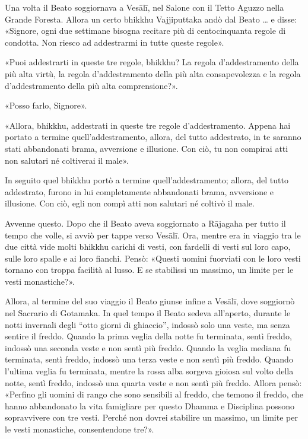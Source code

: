 
Una volta il Beato soggiornava a Vesālī, nel Salone con il Tetto Aguzzo nella
Grande Foresta. Allora un certo bhikkhu Vajjiputtaka andò dal Beato … e disse:
«Signore, ogni due settimane bisogna recitare più di centocinquanta regole di
condotta. Non riesco ad addestrarmi in tutte queste regole».

«Puoi addestrarti in queste tre regole, bhikkhu? La regola d’addestramento della
più alta virtù, la regola d’addestramento della più alta consapevolezza e la
regola d’addestramento della più alta comprensione?».

«Posso farlo, Signore».

«Allora, bhikkhu, addestrati in queste tre regole d’addestramento. Appena hai
portato a termine quell’addestramento, allora, del tutto addestrato, in te
saranno stati abbandonati brama, avversione e illusione. Con ciò, tu non
compirai atti non salutari né coltiverai il male».

In seguito quel bhikkhu portò a termine quell’addestramento; allora, del tutto
addestrato, furono in lui completamente abbandonati brama, avversione e
illusione. Con ciò, egli non compì atti non salutari né coltivò il male.


 Avvenne questo. Dopo che il Beato aveva soggiornato a
Rājagaha per tutto il tempo che volle, si avviò per tappe verso Vesālī. Ora,
mentre era in viaggio tra le due città vide molti bhikkhu carichi di vesti, con
fardelli di vesti sul loro capo, sulle loro spalle e ai loro fianchi. Pensò:
«Questi uomini fuorviati con le loro vesti tornano con troppa facilità al lusso.
E se stabilissi un massimo, un limite per le vesti monastiche?».

Allora, al termine del suo viaggio il Beato giunse infine a Vesālī, dove
soggiornò nel Sacrario di Gotamaka. In quel tempo il Beato sedeva all’aperto,
durante le notti invernali degli “otto giorni di ghiaccio”, indossò solo una
veste, ma senza sentire il freddo. Quando la prima veglia della notte fu
terminata, sentì freddo, indossò una seconda veste e non sentì più freddo.
Quando la veglia mediana fu terminata, sentì freddo, indossò una terza veste e
non sentì più freddo. Quando l’ultima veglia fu terminata, mentre la rossa alba
sorgeva gioiosa sul volto della notte, sentì freddo, indossò una quarta veste e
non sentì più freddo. Allora pensò: «Perfino gli uomini di rango che sono
sensibili al freddo, che temono il freddo, che hanno abbandonato la vita
famigliare per questo Dhamma e Disciplina possono sopravvivere con tre vesti.
Perché non dovrei stabilire un massimo, un limite per le vesti monastiche,
consentendone tre?».

